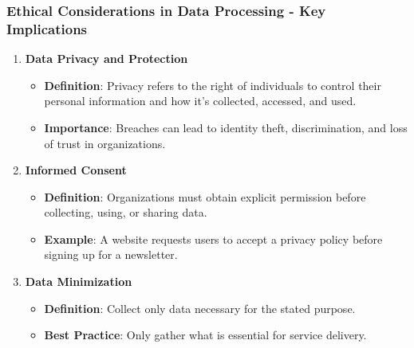 \documentclass[aspectratio=169]{beamer}
\begin{document}
\begin{frame}[fragile]
    \frametitle{Ethical Considerations in Data Processing - Key Implications}
    \begin{enumerate}
        \item \textbf{Data Privacy and Protection}
            \begin{itemize}
                \item \textbf{Definition}: Privacy refers to the right of individuals to control their personal information and how it's collected, accessed, and used.
                \item \textbf{Importance}: Breaches can lead to identity theft, discrimination, and loss of trust in organizations.
            \end{itemize}
        
        \item \textbf{Informed Consent}
            \begin{itemize}
                \item \textbf{Definition}: Organizations must obtain explicit permission before collecting, using, or sharing data.
                \item \textbf{Example}: A website requests users to accept a privacy policy before signing up for a newsletter.
            \end{itemize}

        \item \textbf{Data Minimization}
            \begin{itemize}
                \item \textbf{Definition}: Collect only data necessary for the stated purpose.
                \item \textbf{Best Practice}: Only gather what is essential for service delivery.
            \end{itemize}
    \end{enumerate}
\end{frame}
\end{document}
